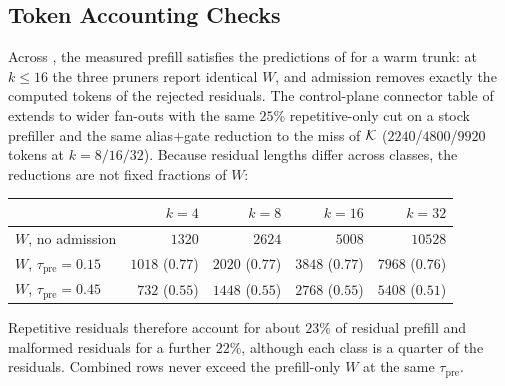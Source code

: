 \subsection{Token Accounting Checks}
\label{sec:ablate-idents}

Across , the measured prefill satisfies the predictions of  for a warm trunk:
at $k\le16$ the three pruners report identical $W$, and admission removes exactly the computed tokens of the rejected residuals.
The control-plane connector table of  extends to wider fan-outs with the same $25\%$ repetitive-only cut on a stock prefiller and the same alias$+$gate reduction to the miss of $\mathcal{K}$ ($2240$/$4800$/$9920$ tokens at $k{=}8/16/32$).
Because residual lengths differ across classes, the reductions are not fixed fractions of $W$:
\begin{center}
\scriptsize
\begin{tabular}{@{}lrrrr@{}}
\toprule
 & $k{=}4$ & $k{=}8$ & $k{=}16$ & $k{=}32$ \\
\midrule
$W$, no admission & $1320$ & $2624$ & $5008$ & $10528$ \\
$W$, $\tau_{\mathrm{pre}}{=}0.15$ & $1018$ ($0.77$) & $2020$ ($0.77$) & $3848$ ($0.77$) & $7968$ ($0.76$) \\
$W$, $\tau_{\mathrm{pre}}{=}0.45$ & $732$ ($0.55$) & $1448$ ($0.55$) & $2768$ ($0.55$) & $5408$ ($0.51$) \\
\bottomrule
\end{tabular}
\end{center}
Repetitive residuals therefore account for about $23\%$ of residual prefill and malformed residuals for a further $22\%$, although each class is a quarter of the residuals.
Combined rows never exceed the prefill-only $W$ at the same $\tau_{\mathrm{pre}}$.
